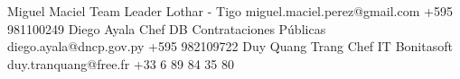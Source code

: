%
%
%

\begin{referees}
		{Miguel Maciel}
		{Team Leader}
		{Lothar - Tigo}
		{miguel.maciel.perez@gmail.com}
		{+595 981100249}
		{Diego Ayala}
		{Chef DB}
		{Contrataciones Públicas}
		{diego.ayala@dncp.gov.py}
		{+595 982109722}
		{Duy Quang Trang}
		{Chef IT}
		{Bonitasoft}
		{duy.tranquang@free.fr}
		{+33 6 89 84 35 80‬}
\end{referees}